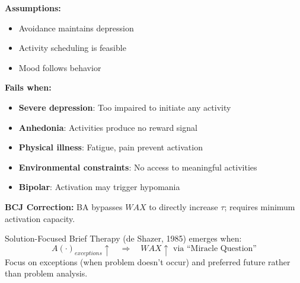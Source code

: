\begin{tcolorbox}[colback=red!5!white, colframe=red!75!black, title=Boundary Condition: Where BA Fails]
\textbf{Assumptions:}
\begin{itemize}[nosep]
\item Avoidance maintains depression
\item Activity scheduling is feasible
\item Mood follows behavior
\end{itemize}

\textbf{Fails when:}
\begin{itemize}[nosep]
\item \textbf{Severe depression}: Too impaired to initiate any activity
\item \textbf{Anhedonia}: Activities produce no reward signal
\item \textbf{Physical illness}: Fatigue, pain prevent activation
\item \textbf{Environmental constraints}: No access to meaningful activities
\item \textbf{Bipolar}: Activation may trigger hypomania
\end{itemize}

\textbf{BCJ Correction:} BA bypasses $WAX$ to directly increase $\tau$; requires minimum activation capacity.
\end{tcolorbox}


\begin{theorem}
\label{thm:sfbt}
Solution-Focused Brief Therapy (de Shazer, 1985) emerges when:
\begin{equation}
\boxed{A(\cdot)_{exceptions} \uparrow \quad \Rightarrow \quad WAX \uparrow \text{ via ``Miracle Question''}}
\end{equation}
Focus on exceptions (when problem doesn't occur) and preferred future rather than problem analysis.
\end{theorem}

